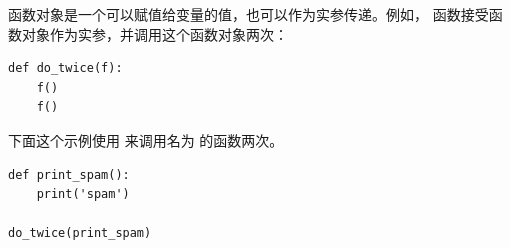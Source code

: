 \begin{exercise}
  


函数对象是一个可以赋值给变量的值，也可以作为实参传递。例如，
{\em {}} 函数接受函数对象作为实参，并调用这个函数对象两次：

\begin{em}
\begin{lstlisting}
def do_twice(f):
    f()
    f()
\end{lstlisting}
\end{em}


下面这个示例使用 {\em {}} 来调用名为 {\em {}} 的函数两次。

\begin{em}
\begin{lstlisting}
def print_spam():
    print('spam')

do_twice(print_spam)
\end{lstlisting}
\end{em}


\begin{enumerate}


\end{enumerate}
\end{exercise}
